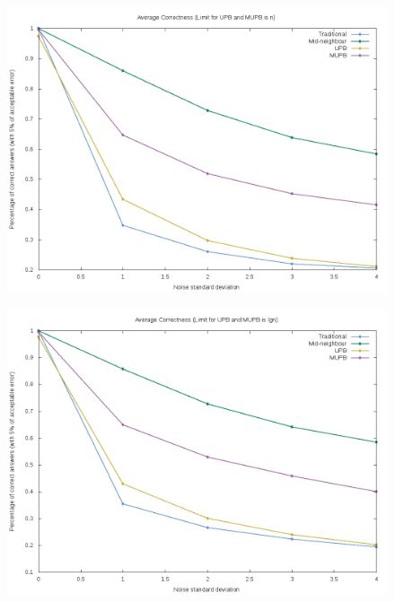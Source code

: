 \documentclass[12pt]{article}
\begin{document}
\begin{figure}[H]
    \centering
    \includegraphics[scale=.5]{correctness_plot_ln}
\end{figure}

\begin{figure}[H]
    \centering
    \includegraphics[scale=.5]{correctness_plot_lgn}
\end{figure}
\end{document}
